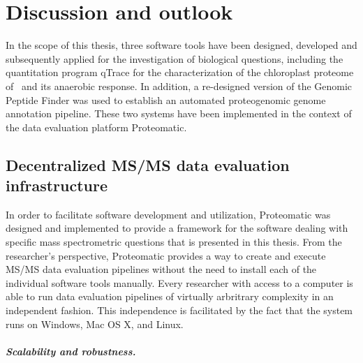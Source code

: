 \cleardoublepage
{}
\chapter{Discussion and outlook}

In the scope of this thesis, three software tools have been designed, 
developed and subsequently applied for the investigation of biological 
questions, including the quantitation program qTrace for the characterization 
of the chloroplast proteome of \cre~and its anaerobic response.
In addition, a re-designed version of the Genomic Peptide Finder was used
to establish an automated proteogenomic genome annotation pipeline.
These two systems have been implemented in the context of the data evaluation
platform Proteomatic.

\section{Decentralized MS/MS data evaluation infrastructure}

In order to facilitate software development and utilization, Proteomatic
was designed and implemented to provide a framework for the software
dealing with specific mass spectrometric questions that is presented in 
this thesis.
From the researcher's perspective, Proteomatic provides a way to create and
execute MS/MS data evaluation pipelines without the need to install each of
the individual software tools manually.
Every researcher with access to a computer is able to run data evaluation
pipelines of virtually arbritrary complexity in an independent fashion.
This independence is facilitated by the fact that the system runs on Windows,
Mac OS X, and Linux.

\paragraph{Scalability and robustness.}

